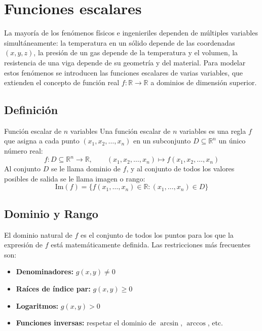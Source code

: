 \section{Funciones escalares}

La mayoría de los fenómenos físicos e ingenieriles dependen de múltiples variables simultáneamente: la temperatura en un sólido depende de las coordenadas $(x, y, z)$, la presión de un gas depende de la temperatura y el volumen, la resistencia de una viga depende de su geometría y del material. Para modelar estos fenómenos se introducen las funciones escalares de varias variables, que extienden el concepto de función real $f: \mathbb{R} \to \mathbb{R}$ a dominios de dimensión superior.

\subsection{Definición}

\begin{mydefinition}{Función escalar de $n$ variables}
Una función escalar de $n$ variables es una regla $f$ que asigna a cada punto $(x_1, x_2, \dots, x_n)$ en un subconjunto $D \subseteq \mathbb{R}^n$ un único número real:
\[ f: D \subseteq \mathbb{R}^n \longrightarrow \mathbb{R}, \qquad (x_1, x_2, \dots, x_n) \longmapsto f(x_1, x_2, \dots, x_n) \]
Al conjunto $D$ se le llama dominio de $f$, y al conjunto de todos los valores posibles de salida se le llama imagen o rango:
\[ \text{Im}(f) = \{f(x_1, \dots, x_n) \in \mathbb{R} : (x_1, \dots, x_n) \in D\} \]
\end{mydefinition}

\subsection{Dominio y Rango}

El dominio natural de $f$ es el conjunto de todos los puntos para los que la expresión de $f$ está matemáticamente definida. Las restricciones más frecuentes son:

\begin{itemize}
    \item \textbf{Denominadores:} $g(x,y) \neq 0$
    \item \textbf{Raíces de índice par:} $g(x,y) \geq 0$
    \item \textbf{Logaritmos:} $g(x,y) > 0$
    \item \textbf{Funciones inversas:} respetar el dominio de $\arcsin$, $\arccos$, etc.
\end{itemize}

